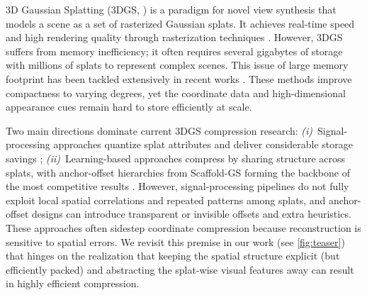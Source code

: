 \documentclass{article}
\begin{document}
%

3D Gaussian Splatting (3DGS, \cite{kerbl20233dgs}) is a paradigm for novel view synthesis that models a scene as a set of rasterized Gaussian splats. It achieves real-time speed and high rendering quality through rasterization techniques \cite{lassner2021pulsar}. However, 3DGS suffers from memory inefficiency; it often requires several gigabytes of storage with millions of splats to represent complex scenes. This issue of large memory footprint has been tackled extensively in recent works \cite{chen2024hac,chen2025hac++,liu2024hemgs, navaneet2024compgs,lee2024compact3d,niedermayr2024compressed3d,papantonakis2024reducing3d,morgenstern2024sog,fan2024lightgaussian,wang2024contextgs,mallick2024taming3dgs,fang2024minisplatting,zhang2025gaussianspa,pateux2025bogauss,ren2024octree,girish2024eagles,wang2025nsvqgs,ye2025gsplat}. These methods improve compactness to varying degrees, yet the coordinate data and high-dimensional appearance cues remain hard to store efficiently at scale.

%

Two main directions dominate current 3DGS compression research: {\em (i)}~Signal-processing approaches quantize splat attributes and deliver considerable storage savings \citep{navaneet2024compgs,lee2024compact3d,fan2024lightgaussian,papantonakis2024reducing3d,niedermayr2024compressed3d,wang2025nsvqgs}; {\em (ii)}~Learning-based approaches compress by sharing structure across splats, with anchor-offset hierarchies from Scaffold-GS \citep{lu2024scaffoldgs} forming the backbone of the most competitive results \citep{chen2024hac,chen2025hac++,liu2024hemgs,wang2024contextgs}. However, signal-processing pipelines do not fully exploit local spatial correlations and repeated patterns among splats, and anchor-offset designs can introduce transparent or invisible offsets and extra heuristics. These approaches often sidestep coordinate compression because reconstruction is sensitive to spatial errors. We revisit this premise in our work (see \cref{fig:teaser}) that hinges on the realization that keeping the spatial structure explicit (but efficiently packed) and abstracting the splat-wise visual features away can result in highly efficient compression. 
%


%
\end{document}
